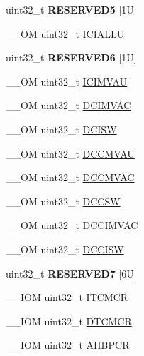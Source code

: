 \begin{DoxyCompactItemize}
uint32\+\_\+t {\bfseries R\+E\+S\+E\+R\+V\+E\+D5} \mbox{[}1\+U\mbox{]}
\item 
\+\_\+\+\_\+\+OM uint32\+\_\+t \mbox{\hyperlink{struct_s_c_b___type_a011024c365e7c5bd13a63830af60b10c}{I\+C\+I\+A\+L\+LU}}
\item 
\mbox{\label{struct_s_c_b___type_aecf1563d46d998532d9a9fdb0a9affff}} 
uint32\+\_\+t {\bfseries R\+E\+S\+E\+R\+V\+E\+D6} \mbox{[}1\+U\mbox{]}
\item 
\+\_\+\+\_\+\+OM uint32\+\_\+t \mbox{\hyperlink{struct_s_c_b___type_a1a8ecda7b1e4a1100dd82fc694bb4eb5}{I\+C\+I\+M\+V\+AU}}
\item 
\+\_\+\+\_\+\+OM uint32\+\_\+t \mbox{\hyperlink{struct_s_c_b___type_a72402d657f9e448afce57bbd8577864d}{D\+C\+I\+M\+V\+AC}}
\item 
\+\_\+\+\_\+\+OM uint32\+\_\+t \mbox{\hyperlink{struct_s_c_b___type_aca1ec746911b0934dd11c31d93a369be}{D\+C\+I\+SW}}
\item 
\+\_\+\+\_\+\+OM uint32\+\_\+t \mbox{\hyperlink{struct_s_c_b___type_a9d4029e220311690756d836948e71393}{D\+C\+C\+M\+V\+AU}}
\item 
\+\_\+\+\_\+\+OM uint32\+\_\+t \mbox{\hyperlink{struct_s_c_b___type_acc23dc74d8f0378d81bc72302e325e50}{D\+C\+C\+M\+V\+AC}}
\item 
\+\_\+\+\_\+\+OM uint32\+\_\+t \mbox{\hyperlink{struct_s_c_b___type_a2bf149d6d8f4fa59e25aee340512cb79}{D\+C\+C\+SW}}
\item 
\+\_\+\+\_\+\+OM uint32\+\_\+t \mbox{\hyperlink{struct_s_c_b___type_a18ef4bf4fbbb205544985598b1bb64f4}{D\+C\+C\+I\+M\+V\+AC}}
\item 
\+\_\+\+\_\+\+OM uint32\+\_\+t \mbox{\hyperlink{struct_s_c_b___type_ab6e447723358e736a9f69ffc88a97ba1}{D\+C\+C\+I\+SW}}
\item 
\mbox{\label{struct_s_c_b___type_a673086408889531c2e8220a306411a43}} 
uint32\+\_\+t {\bfseries R\+E\+S\+E\+R\+V\+E\+D7} \mbox{[}6\+U\mbox{]}
\item 
\+\_\+\+\_\+\+I\+OM uint32\+\_\+t \mbox{\hyperlink{struct_s_c_b___type_a18d1734811b40e7edf6e5213bf336ca8}{I\+T\+C\+M\+CR}}
\item 
\+\_\+\+\_\+\+I\+OM uint32\+\_\+t \mbox{\hyperlink{struct_s_c_b___type_ad5a9c8098433fa3ac108487e0ccd9cfc}{D\+T\+C\+M\+CR}}
\item 
\+\_\+\+\_\+\+I\+OM uint32\+\_\+t \mbox{\hyperlink{struct_s_c_b___type_a209b4026c2994d0e18e883aa9af5c3cc}{A\+H\+B\+P\+CR}}

\end{DoxyCompactItemize}
